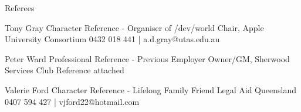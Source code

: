 \begin{tmrsection}{Referees}

\tmrshortentry
 	 {Tony Gray}
 	 {Character Reference - Organiser of /dev/world}
 	 {Chair, Apple University Consortium}
 	 {0432 018 441 | a.d.gray@utas.edu.au}
  	
\tmrshortentry
 	 {Peter Ward}
 	 {Professional Reference - Previous Employer}
 	 {Owner/GM, Sherwood Services Club}
 	 {Reference attached}
    
\tmrshortentry
 	 {Valerie Ford}
 	 {Character Reference - Lifelong Family Friend}
 	 {Legal Aid Queensland}
 	 {0407 594 427 | vjford22@hotmail.com}
	
\end{tmrsection}
